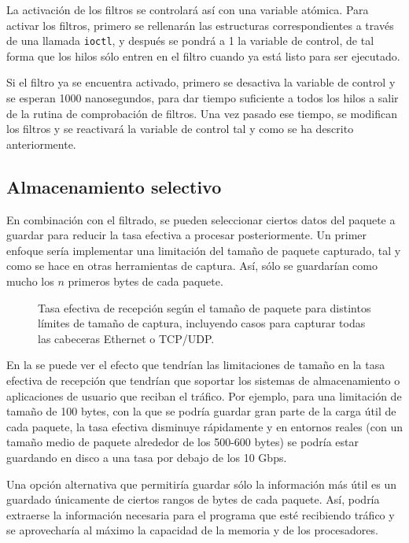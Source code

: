 \documentclass[oneside, draft]{epstfg}
\begin{document}
La activación de los filtros se controlará así con una variable atómica. Para activar los filtros, primero se rellenarán las estructuras correspondientes a través de una llamada \texttt{ioctl}, y después se pondrá a 1 la variable de control, de tal forma que los hilos sólo entren en el filtro cuando ya está listo para ser ejecutado.

Si el filtro ya se encuentra activado, primero se desactiva la variable de control y se esperan 1000 nanosegundos, para dar tiempo suficiente a todos los hilos a salir de la rutina de comprobación de filtros. Una vez pasado ese tiempo, se modifican los filtros y se reactivará la variable de control tal y como se ha descrito anteriormente.

\subsection{Almacenamiento selectivo}

En combinación con el filtrado, se pueden seleccionar ciertos datos del paquete a guardar para reducir la tasa efectiva a procesar posteriormente. Un primer enfoque sería implementar una limitación del tamaño de paquete capturado, tal y como se hace en otras herramientas de captura. Así, sólo se guardarían como mucho los $n$ primeros bytes de cada paquete.

\begin{figure}[btp]
\caption[Tasa efectiva limitando el tamaño de paquete]{Tasa efectiva de recepción según el tamaño de paquete para distintos límites de tamaño de captura, incluyendo casos para capturar todas las cabeceras Ethernet o TCP/UDP.}
\label{fig:Desarrollo:CaplenEffects}
\end{figure}

En la  se puede ver el efecto que tendrían las limitaciones de tamaño en la tasa efectiva de recepción que tendrían que soportar los sistemas de almacenamiento o aplicaciones de usuario que reciban el tráfico. Por ejemplo, para una limitación de tamaño de 100 bytes, con la que se podría guardar gran parte de la carga útil de cada paquete, la tasa efectiva disminuye rápidamente y en entornos reales (con un tamaño medio de paquete alrededor de los 500-600 bytes) se podría estar guardando en disco a una tasa por debajo de los 10 Gbps.

Una opción alternativa que permitiría guardar sólo la información más útil es un guardado únicamente de ciertos rangos de bytes de cada paquete. Así, podría extraerse la información necesaria para el programa que esté recibiendo tráfico y se aprovecharía al máximo la capacidad de la memoria y de los procesadores.
\end{document}

